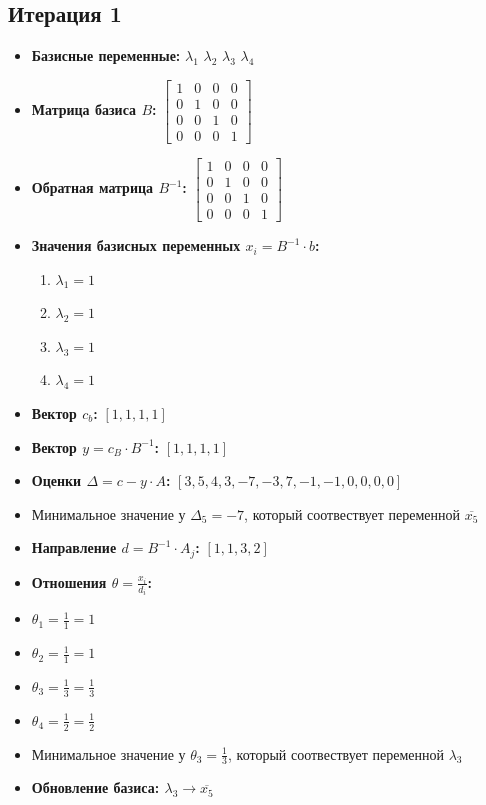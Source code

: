 \begin{itemize}
\subsection*{Итерация 1}
\begin{itemize}
\item \textbf{Базисные переменные:}
$\lambda_1$
$\lambda_2$
$\lambda_3$
$\lambda_4$
\item \textbf{Матрица базиса $B$:}
$\left[\begin{matrix}1 & 0 & 0 & 0\\0 & 1 & 0 & 0\\0 & 0 & 1 & 0\\0 & 0 & 0 & 1\end{matrix}\right]$
\item \textbf{Обратная матрица $B^{-1}$:}
$\left[\begin{matrix}1 & 0 & 0 & 0\\0 & 1 & 0 & 0\\0 & 0 & 1 & 0\\0 & 0 & 0 & 1\end{matrix}\right]$
\item \textbf{Значения базисных переменных $ x_i = B^{-1} \cdot b$:}
\begin{enumerate}
\item $\lambda_1 = 1$
\item $\lambda_2 = 1$
\item $\lambda_3 = 1$
\item $\lambda_4 = 1$
\end{enumerate}
\item \textbf{Вектор $c_b$:}
$[1, 1, 1, 1]$
\item \textbf{Вектор $y = c_B \cdot B^{-1}$:}
$[1, 1, 1, 1]$
\item \textbf{Оценки $\Delta = c - y \cdot A$:}
$[3, 5, 4, 3, -7, -3, 7, -1, -1, 0, 0, 0, 0]$
\item Минимальное значение у  $\Delta_{5} = -7$, который соотвествует переменной $\overline{x_{5}}$
\item \textbf{Направление $d = B^{-1} \cdot A_j$:}
$[1, 1, 3, 2]$
\item \textbf{Отношения $\theta = \frac{x_i}{d_i}$:}
\item $\theta_{1} = \frac{1}{1} = 1$
\item $\theta_{2} = \frac{1}{1} = 1$
\item $\theta_{3} = \frac{1}{3} = \frac{1}{3}$
\item $\theta_{4} = \frac{1}{2} = \frac{1}{2}$
\item Минимальное значение у  $\theta_{3} = \frac{1}{3}$, который соотвествует переменной $\lambda_3$
\item \textbf{Обновление базиса: $\lambda_3 \rightarrow \overline{x_{5}}$}
\end{itemize}
\newpage

\end{itemize}
